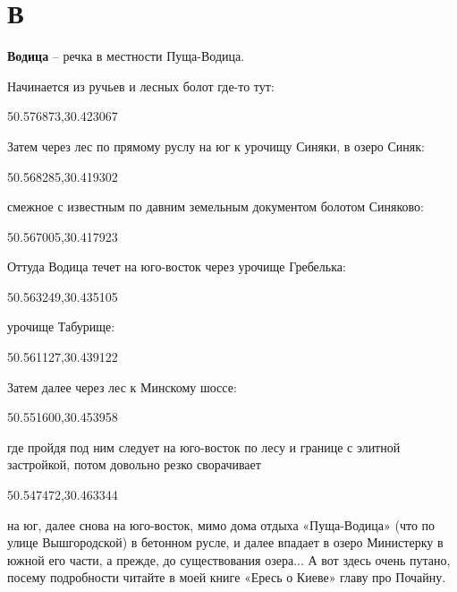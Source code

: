 \chapter*{В}

\textbf{Водица} – речка в местности Пуща-Водица.

Начинается из ручьев и лесных болот где-то тут:

50.576873,30.423067

Затем через лес по прямому руслу на юг к урочищу Синяки, в озеро Синяк:

50.568285,30.419302

смежное с известным по давним земельным документом болотом Синяково:

50.567005,30.417923

Оттуда Водица течет на юго-восток через урочище Гребелька:

50.563249,30.435105

урочище Табурище:

50.561127,30.439122

Затем далее через лес к Минскому шоссе:

50.551600,30.453958

где пройдя под ним следует на юго-восток по лесу и границе с элитной застройкой, потом довольно резко сворачивает 

50.547472,30.463344

на юг, далее снова на юго-восток, мимо дома отдыха «Пуща-Водица» (что по улице Вышгородской) в бетонном русле, и далее впадает в озеро Министерку в южной его части, а прежде, до существования озера... А вот здесь очень путано, посему  подробности читайте в моей книге «Ересь о Киеве»  главу про Почайну.\\

\medskip





